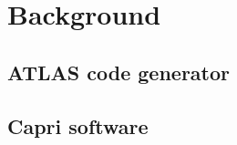 \section{Background}
\label{sec:background}

  \subsection{ATLAS code generator}
  \label{sec:atlas_intro}

  \subsection{Capri software}
  \label{sec:Capri_intro}
